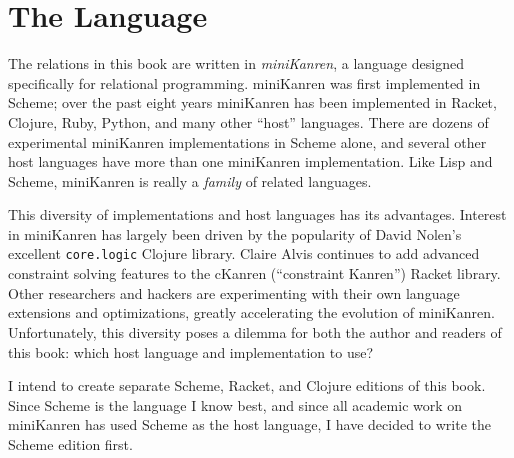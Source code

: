 
\newpage

\section{The Language}\label{sec:preface:language}

The relations in this book are written in \emph{miniKanren}, a language
designed specifically for relational programming.
%
miniKanren was first implemented in Scheme; over the past eight years
miniKanren has been implemented in Racket,
 Clojure, Ruby, Python,
and many other ``host'' languages.
%
There are dozens of experimental miniKanren implementations in Scheme
alone, and several other host languages have more than one miniKanren
implementation.
%
Like Lisp and Scheme, miniKanren is really a \emph{family} of related
languages.
%

This diversity of implementations and host languages has its advantages.
%
Interest in miniKanren has largely been driven by the popularity of
David Nolen's excellent {\tt core.logic} Clojure library.
%
Claire Alvis continues to add advanced constraint solving features to the
cKanren
(``constraint Kanren'') Racket library.
%
Other researchers and hackers are experimenting with their own
language extensions and optimizations, greatly accelerating the
evolution of miniKanren.
%
Unfortunately, this diversity poses a dilemma for both the author
and readers of this book: which host language and implementation to
use?

I intend to create separate Scheme, Racket, and Clojure editions of
this book.
%
Since Scheme is the language I know best, and since all academic work
on miniKanren has used Scheme as the host language, I have decided to
write the Scheme edition first.





